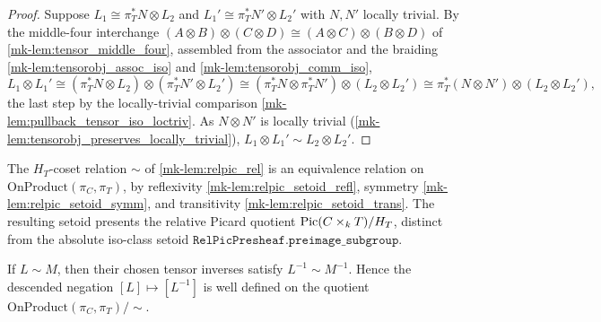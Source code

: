 \begin{proof}
  \leanok
  Suppose \(L_1 \cong \pi_T^* N \otimes L_2\) and
  \(L_1' \cong \pi_T^* N' \otimes L_2'\) with \(N, N'\) locally trivial. By the
  middle-four interchange
  \((A \otimes B) \otimes (C \otimes D) \cong (A \otimes C) \otimes (B \otimes D)\)
  of \ref{mk-lem:tensor_middle_four}, assembled from the associator and the
  braiding \ref{mk-lem:tensorobj_assoc_iso} and \ref{mk-lem:tensorobj_comm_iso},
  \[
    L_1 \otimes L_1'
      \cong (\pi_T^* N \otimes L_2) \otimes (\pi_T^* N' \otimes L_2')
      \cong (\pi_T^* N \otimes \pi_T^* N') \otimes (L_2 \otimes L_2')
      \cong \pi_T^*(N \otimes N') \otimes (L_2 \otimes L_2') ,
  \]
  the last step by the locally-trivial comparison
  \ref{mk-lem:pullback_tensor_iso_loctriv}. As \(N \otimes N'\) is locally
  trivial (\ref{mk-lem:tensorobj_preserves_locally_trivial}),
  \(L_1 \otimes L_1' \sim L_2 \otimes L_2'\).
\end{proof}

\begin{definition}\label{mk-lem:relpic_setoid}
  \leanok

  The \(H_T\)-coset relation \(\sim\) of \ref{mk-lem:relpic_rel} is an equivalence
  relation on \(\mathrm{OnProduct}(\pi_C, \pi_T)\), by reflexivity
  \ref{mk-lem:relpic_setoid_refl}, symmetry \ref{mk-lem:relpic_setoid_symm}, and
  transitivity \ref{mk-lem:relpic_setoid_trans}. The resulting setoid presents the
  relative Picard quotient \(\operatorname{Pic}(C \times_k T) / H_T\), distinct from the
  absolute iso-class setoid \(\mathtt{RelPicPresheaf.preimage\_subgroup}\).
\end{definition}

\begin{lemma}\label{mk-lem:relpic_rel_neg}
  \leanok

  If \(L \sim M\), then their chosen tensor inverses satisfy \(L^{-1} \sim
  M^{-1}\). Hence the descended negation \([L] \mapsto [L^{-1}]\) is well defined
  on the quotient \(\mathrm{OnProduct}(\pi_C, \pi_T) / {\sim}\).
\end{lemma}


